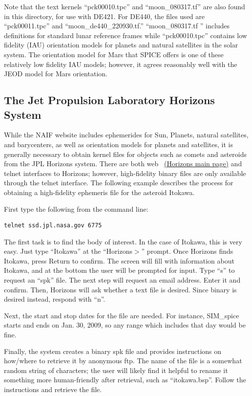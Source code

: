 Note that the text kernels
``pck00010.tpc'' and ``moon\_080317.tf'' are also found in this directory,
for use with DE421. For DE440, the files used are ``pck00011.tpc'' and
``moon\_de440\_220930.tf.'' ``moon\_080317.tf '' includes definitions for
standard lunar reference frames while ``pck00010.tpc'' contains
low fidelity (IAU) orientation models for planets and natural satellites in the
solar system. The orientation model for Mars that SPICE offers is one of these
relatively low fidelity IAU models; however, it agrees reasonably well with
the JEOD model for Mars orientation.


\subsection {The Jet Propulsion Laboratory Horizons System}
\label{subsec:horizons}
While the NAIF website includes ephemerides for Sun, Planets, natural
satellites, and barycenters, as well as orientation models for planets and
satellites, it is generally necessary to obtain kernel files for objects
such as comets and asteroids from the JPL Horizons system.  There are both
web ~\href{http://ssd.jpl.nasa.gov/?horizons}{(Horizons main page)} and telnet
interfaces to Horizons; however, high-fidelity binary files are only
available through the telnet interface.  The following example describes the
process for obtaining a high-fidelity ephemeris file for the asteroid Itokawa.

First type the following from the command line:
\begin{verbatim}
telnet ssd.jpl.nasa.gov 6775
\end{verbatim}
The first task is to find the body of interest. In the case of Itokawa, this
is very easy. Just type ``Itokawa'' at the ``Horizons$>$'' prompt. Once Horizons
finds Itokawa, press Return to confirm. The screen will fill with information
about Itokawa, and at the bottom the user will be prompted for input.  Type
``s'' to request an ``spk'' file.  The next step will request an email address.
Enter it and confirm.  Then, Horizons will ask whether a text file is desired.
Since binary is desired instead, respond with ``n''.

Next, the start and stop dates for the file are needed. For instance,
SIM\_spice starts and ends on Jan. 30, 2009, so any range which includes that
day would be fine.

Finally, the system creates a binary spk file and provides instructions on
how/where to retrieve it by anonymous ftp. The name of the file is a somewhat
random string of characters; the user will likely find it helpful to rename
it something more human-friendly after retrieval, such as ``itokawa.bsp''.
Follow the instructions and retrieve the file.



